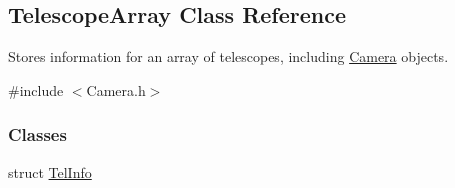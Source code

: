 \hypertarget{classTelescopeArray}{
\subsection{TelescopeArray Class Reference}
\label{classTelescopeArray}
}


Stores information for an array of telescopes, including \hyperlink{classCamera}{Camera} objects.  




{\ttfamily \#include $<$Camera.h$>$}

\subsubsection*{Classes}
\begin{DoxyCompactItemize}
\item 
struct \hyperlink{structTelescopeArray_1_1TelInfo}{TelInfo}
\end{DoxyCompactItemize}
